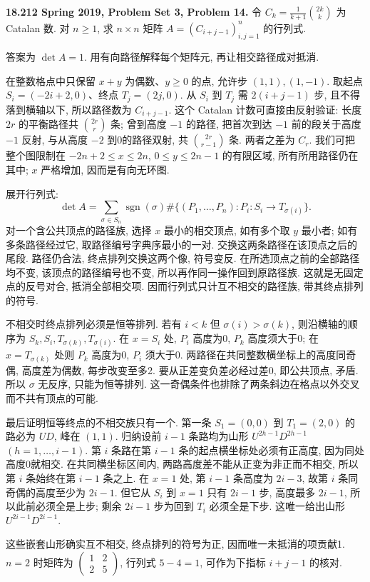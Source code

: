 \begin{exercise}\label{mit:18212-pset3-q14}
\textbf{18.212 Spring 2019, Problem Set 3, Problem 14.}
令 $C_k=\frac1{k+1}\binom{2k}k$ 为 Catalan 数. 对 $n\ge1$, 求 $n\times n$ 矩阵 $A=(C_{i+j-1})_{i,j=1}^n$ 的行列式.
\end{exercise}
\begin{solution}
答案为 $\det A=1$. 用有向路径解释每个矩阵元, 再让相交路径成对抵消.

在整数格点中只保留 $x+y$ 为偶数、$y\ge0$ 的点, 允许步 $(1,1),(1,-1)$. 取起点 $S_i=(-2i+2,0)$、终点 $T_j=(2j,0)$. 从 $S_i$ 到 $T_j$ 需 $2(i+j-1)$ 步, 且不得落到横轴以下, 所以路径数为 $C_{i+j-1}$. 这个 Catalan 计数可直接由反射验证: 长度 $2r$ 的平衡路径共 $\binom{2r}r$ 条; 曾到高度 $-1$ 的路径, 把首次到达 $-1$ 前的段关于高度 $-1$ 反射, 与从高度 $-2$ 到0的路径双射, 共 $\binom{2r}{r-1}$ 条. 两者之差为 $C_r$. 我们可把整个图限制在 $-2n+2\le x\le2n$, $0\le y\le2n-1$ 的有限区域, 所有所用路径仍在其中; $x$ 严格增加, 因而是有向无环图.

展开行列式:
\[
 \det A=\sum_{\sigma\in S_n}\operatorname{sgn}(\sigma)
   \#\{(P_1,\ldots,P_n):P_i:S_i\longrightarrow T_{\sigma(i)}\}.
\]
对一个含公共顶点的路径族, 选择 $x$ 最小的相交顶点, 如有多个取 $y$ 最小者; 如有多条路径经过它, 取路径编号字典序最小的一对. 交换这两条路径在该顶点之后的尾段. 路径仍合法, 终点排列交换这两个像, 符号变反. 在所选顶点之前的全部路径均不变, 该顶点的路径编号也不变, 所以再作同一操作回到原路径族. 这就是无固定点的反号对合, 抵消全部相交项. 因而行列式只计互不相交的路径族, 带其终点排列的符号.

不相交时终点排列必须是恒等排列. 若有 $i<k$ 但 $\sigma(i)>\sigma(k)$, 则沿横轴的顺序为
$S_k,S_i,T_{\sigma(k)},T_{\sigma(i)}$. 在 $x=S_i$ 处, $P_i$ 高度为0, $P_k$ 高度须大于0; 在 $x=T_{\sigma(k)}$ 处则 $P_k$ 高度为0, $P_i$ 须大于0. 两路径在共同整数横坐标上的高度同奇偶, 高度差为偶数, 每步改变至多2. 要从正差变负差必经过差0, 即公共顶点, 矛盾. 所以 $\sigma$ 无反序, 只能为恒等排列. 这一奇偶条件也排除了两条斜边在格点以外交叉而不共有顶点的可能.

最后证明恒等终点的不相交族只有一个. 第一条 $S_1=(0,0)$ 到 $T_1=(2,0)$ 的路必为 $UD$, 峰在 $(1,1)$. 归纳设前 $i-1$ 条路均为山形
$U^{2h-1}D^{2h-1}$ $(h=1,\ldots,i-1)$. 第 $i$ 条路在第 $i-1$ 条的起点横坐标处必须有正高度, 因为同处高度0就相交. 在共同横坐标区间内, 两路高度差不能从正变为非正而不相交, 所以第 $i$ 条始终在第 $i-1$ 条之上. 在 $x=1$ 处, 第 $i-1$ 条高度为 $2i-3$, 故第 $i$ 条同奇偶的高度至少为 $2i-1$. 但它从 $S_i$ 到 $x=1$ 只有 $2i-1$ 步, 高度最多 $2i-1$, 所以此前必须全是上步; 剩余 $2i-1$ 步为回到 $T_i$ 必须全是下步. 这唯一给出山形 $U^{2i-1}D^{2i-1}$.

这些嵌套山形确实互不相交, 终点排列的符号为正, 因而唯一未抵消的项贡献1. $n=2$ 时矩阵为 $\left(\begin{smallmatrix}1&2\\2&5\end{smallmatrix}\right)$, 行列式 $5-4=1$, 可作为下指标 $i+j-1$ 的核对.
\end{solution}
